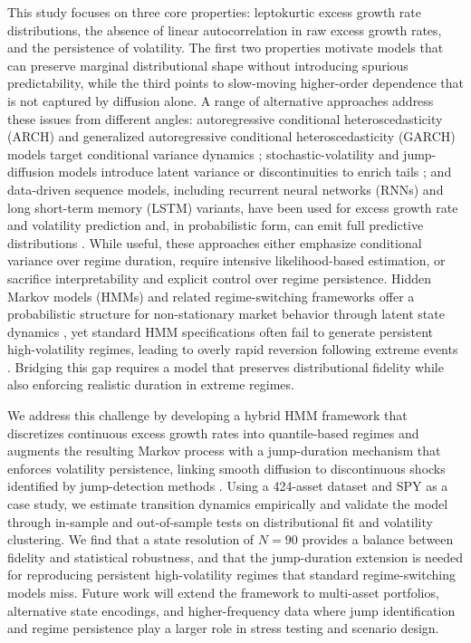 \documentclass[12pt, letterpaper]{article}
\begin{document}
This study focuses on three core properties: leptokurtic excess growth rate distributions, the absence of linear autocorrelation in raw excess growth rates, and the persistence of volatility. The first two properties motivate models that can preserve marginal distributional shape without introducing spurious predictability, while the third points to slow-moving higher-order dependence that is not captured by diffusion alone. A range of alternative approaches address these issues from different angles: autoregressive conditional heteroscedasticity (ARCH) and generalized autoregressive conditional heteroscedasticity (GARCH) models target conditional variance dynamics \cite{engle_1982, bollerslev_garch_1986}; stochastic-volatility and jump-diffusion models introduce latent variance or discontinuities to enrich tails \cite{heston_stochastic_1993, merton_jump_1976}; and data-driven sequence models, including recurrent neural networks (RNNs) and long short-term memory (LSTM) variants, have been used for excess growth rate and volatility prediction and, in probabilistic form, can emit full predictive distributions \cite{elman_rnn_1990, hochreiter_lstm_1997, fischer_krauss_2018, salinas_deepar_2020, liu_rnn_volatility_2017, choi_arima_lstm_2018, alparslan_gamestop_2021}. While useful, these approaches either emphasize conditional variance over regime duration, require intensive likelihood-based estimation, or sacrifice interpretability and explicit control over regime persistence. Hidden Markov models (HMMs) and related regime-switching frameworks offer a probabilistic structure for non-stationary market behavior through latent state dynamics \cite{rabiner_introduction_1986}, yet standard HMM specifications often fail to generate persistent high-volatility regimes, leading to overly rapid reversion following extreme events \cite{ryden_stylized_1998, bulla_stylized_2006}. Bridging this gap requires a model that preserves distributional fidelity while also enforcing realistic duration in extreme regimes.

We address this challenge by developing a hybrid HMM framework that discretizes continuous excess growth rates into quantile-based regimes and augments the resulting Markov process with a jump-duration mechanism that enforces volatility persistence, linking smooth diffusion to discontinuous shocks identified by jump-detection methods \cite{au_yeung_jump_2020}. Using a 424-asset dataset and SPY as a case study, we estimate transition dynamics empirically and validate the model through in-sample and out-of-sample tests on distributional fit and volatility clustering. We find that a state resolution of $N=90$ provides a balance between fidelity and statistical robustness, and that the jump-duration extension is needed for reproducing persistent high-volatility regimes that standard regime-switching models miss. Future work will extend the framework to multi-asset portfolios, alternative state encodings, and higher-frequency data where jump identification and regime persistence play a larger role in stress testing and scenario design.
\end{document}
